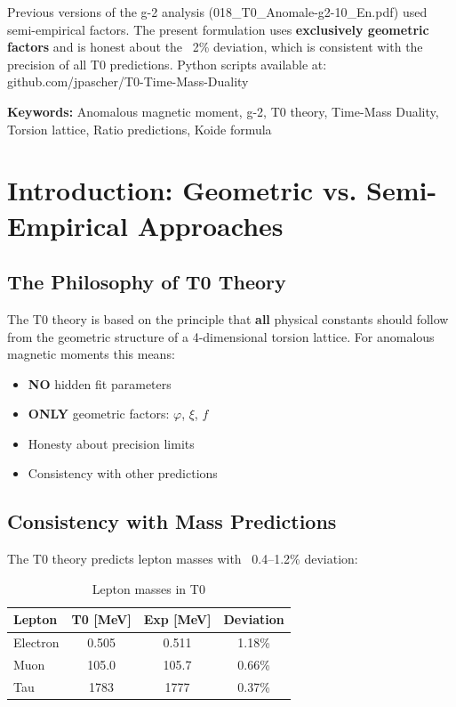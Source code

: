 	
	\begin{tcolorbox}[colback=yellow!10!white, colframe=orange!75!black, title=Note on Older Documents]
		Previous versions of the g-2 analysis (018\_T0\_Anomale-g2-10\_En.pdf) used semi-empirical factors. The present formulation uses \textbf{exclusively geometric factors} and is honest about the ~2\% deviation, which is consistent with the precision of all T0 predictions. Python scripts available at: github.com/jpascher/T0-Time-Mass-Duality
	\end{tcolorbox}
	
	\textbf{Keywords:} Anomalous magnetic moment, g-2, T0 theory, Time-Mass Duality, Torsion lattice, Ratio predictions, Koide formula
	
	
	\section{Introduction: Geometric vs. Semi-Empirical Approaches}
	
	\subsection{The Philosophy of T0 Theory}
	
	The T0 theory is based on the principle that \textbf{all} physical constants should follow from the geometric structure of a 4-dimensional torsion lattice. For anomalous magnetic moments this means:
	
	\begin{itemize}
		\item \textbf{NO} hidden fit parameters
		\item \textbf{ONLY} geometric factors: $\varphi$, $\xi$, $f$
		\item Honesty about precision limits
		\item Consistency with other predictions
	\end{itemize}
	
	\subsection{Consistency with Mass Predictions}
	
	The T0 theory predicts lepton masses with ~0.4--1.2\% deviation:
	
	\begin{table}[h]
		\centering
		\begin{tabular}{lccc}
			\toprule
			\textbf{Lepton} & \textbf{T0 [MeV]} & \textbf{Exp [MeV]} & \textbf{Deviation} \\
			\midrule
			Electron & 0.505 & 0.511 & 1.18\% \\
			Muon & 105.0 & 105.7 & 0.66\% \\
			Tau & 1783 & 1777 & 0.37\% \\
			\bottomrule
		\end{tabular}
		\caption{Lepton masses in T0}
	\end{table}
	

